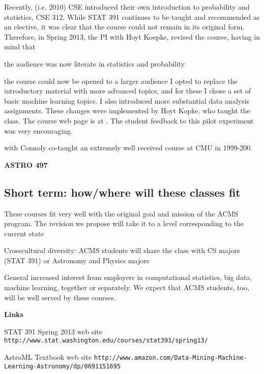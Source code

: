 Recently, (i.e. 2010) CSE introduced their own introduction to probability and statistics, CSE 312.  While STAT 391 continues to be taught and recommended as an elective, it was clear that the course could not remain in its original form.
Therefore, in Spring 2013, the PI \meila with Hoyt Koepke, revised the course, having in mind that
\bit
\item the audience was now literate in statistics and probability
\item the course could now be opened to a larger audience 
\eit
I opted to replace the introductory material with more advanced topics, and for these I chose a set of basic machine learning topics. I also introduced more substantial data analysis assignments. These changes were implemented by Hoyt Kopke, who taught the class. The course web page is at {\tt }. The student feedback to this pilot experiment was very encouraging. 

\meila with Connoly co-taught an extremely well received course at CMU in 1999-200. 

{\bf ASTRO 497}  

\subsection{Short term: how/where will these classes fit}
\bit
\item These courses fit very well with the original goal and mission of the  ACMS program. The revision we propose will take it to a level corresponding to the current state
\item Crosscultural diversity: ACMS students will share the class with CS majors (STAT 391) or Astronomy and Physics majors
\item General increased interest from employers in computational statistics, big data, machine learning, together or separately. We expect that ACMS students, too, will be well served by these courses.

\item[]{\bf Links}
\item STAT 391 Spring 2013 web site {\tt http://www.stat.washington.edu/courses/stat391/spring13/}
\item AstroML Textbook web site {\tt http://www.amazon.com/Data-Mining-Machine-Learning-Astronomy/dp/0691151695}
\eit



